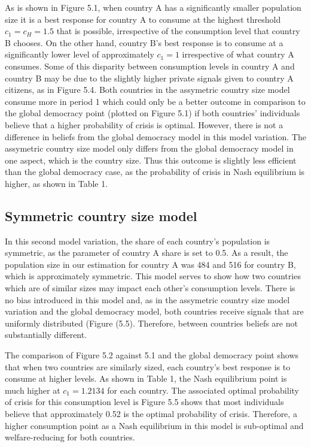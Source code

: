 \documentclass[11pt,preprint, authoryear]{elsarticle}
\numberwithin{equation}{section}
\numberwithin{figure}{section}
\numberwithin{table}{section}
\begin{document}
As is shown in Figure 5.1, when country A has a significantly smaller
population size it is a best response for country A to consume at the
highest threshold \(c_1=c_H=1.5\) that is possible, irrespective of the
consumption level that country B chooses. On the other hand, country B's
best response is to consume at a significantly lower level of
approximately \(c_1=1\) irrespective of what country A consumes. Some of
this disparity between consumption levels in country A and country B may
be due to the slightly higher private signals given to country A
citizens, as in Figure 5.4. Both countries in the assymetric country
size model consume more in period 1 which could only be a better outcome
in comparison to the global democracy point (plotted on Figure 5.1) if
both countries' individuals believe that a higher probability of crisis
is optimal. However, there is not a difference in beliefs from the
global democracy model in this model variation. The assymetric country
size model only differs from the global democracy model in one aspect,
which is the country size. Thus this outcome is slightly less efficient
than the global democracy case, as the probability of crisis in Nash
equilibrium is higher, as shown in Table 1.

\hypertarget{symmetric-country-size-model}{%
\subsection*{Symmetric country size
model}\label{symmetric-country-size-model}}

In this second model variation, the share of each country's population
is symmetric, as the parameter of country A share is set to 0.5. As a
result, the population size in our estimation for country A was 484 and
516 for country B, which is approximately symmetric. This model serves
to show how two countries which are of similar sizes may impact each
other's consumption levels. There is no bias introduced in this model
and, as in the assymetric country size model variation and the global
democracy model, both countries receive signals that are uniformly
distributed (Figure (5.5). Therefore, between countries beliefs are not
substantially different.

The comparison of Figure 5.2 against 5.1 and the global democracy point
shows that when two countries are similarly sized, each country's best
response is to consume at higher levels. As shown in Table 1, the Nash
equilibrium point is much higher at \(c_1=1.2134\) for each country. The
associated optimal probability of crisis for this consumption level is
Figure 5.5 shows that most individuals believe that approximately 0.52
is the optimal probability of crisis. Therefore, a higher consumption
point as a Nash equilibrium in this model is sub-optimal and
welfare-reducing for both countries.
\end{document}
